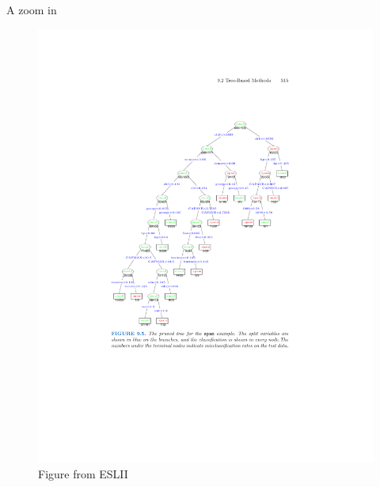 \documentclass[mathserif, aspectratio=169]{beamer}
\begin{document}
\begin{frame}{A zoom in}

\vspace*{-10mm}
\begin{figure}
\includegraphics[height=1.5\textheight]{spam_tree}
\caption*{ Figure from ESLII}
\end{figure}
\end{frame}
\end{document}
